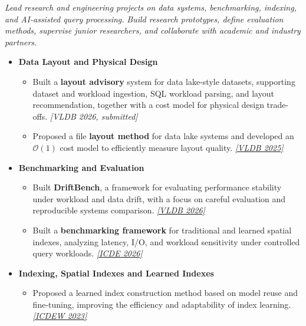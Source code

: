 \documentclass{resume}
\begin{document}
\textit{Lead research and engineering projects on data systems, benchmarking, indexing, and AI-assisted query processing.}
\textit{Build research prototypes, define evaluation methods, supervise junior researchers, and collaborate with academic and industry partners.}

\begin{itemize}[parsep=0.4ex]


\item \textbf{Data Layout and Physical Design}
\begin{itemize}[parsep=0.3ex]
    \item Built a \textbf{layout advisory} system for data lake-style datasets, supporting dataset and workload ingestion, SQL workload parsing, and layout recommendation, together with a cost model for physical design trade-offs.
    \href{https://github.com/Liuguanli/layout_advisor}{\faGithub}
    \textit{[VLDB 2026, submitted]}

    \item Proposed a file \textbf{layout method} for data lake systems and developed an \(\mathcal{O}(1)\) cost model to efficiently measure layout quality.
    \href{https://github.com/Liuguanli/LBMC}{\faGithub}
    \href{https://www.vldb.org/pvldb/vol17/p4773-liu.pdf}{\textit{[VLDB 2025\faExternalLink]}}
\end{itemize}

\item \textbf{Benchmarking and Evaluation}
\begin{itemize}[parsep=0.3ex]
    \item Built \textbf{DriftBench}, a framework for evaluating performance stability under workload and data drift, with a focus on careful evaluation and reproducible systems comparison.
    \href{https://github.com/Liuguanli/DriftBench}{\faGithub}
    \href{https://arxiv.org/abs/2510.10858}{\textit{[VLDB 2026\faExternalLink]}}
    \item Built a \textbf{benchmarking framework} for traditional and learned spatial indexes, analyzing latency, I/O, and workload sensitivity under controlled query workloads. \href{https://github.com/Liuguanli/rl_spatial_benchmark}{\faGithub}
\href{https://arxiv.org/abs/2512.11161}{\textit{[ICDE 2026\faExternalLink]}}
\end{itemize}

\item \textbf{Indexing, Spatial Indexes and Learned Indexes}
\begin{itemize}[parsep=0.3ex]
    \item Proposed a learned index construction method based on model reuse and fine-tuning, improving the efficiency and adaptability of index learning.
\href{https://people.eng.unimelb.edu.au/jianzhongq/papers/DBML2023_ModelReuse.pdf}{\textit{[ICDEW 2023\faExternalLink]}}


\end{itemize}
\end{itemize}
\end{document}
